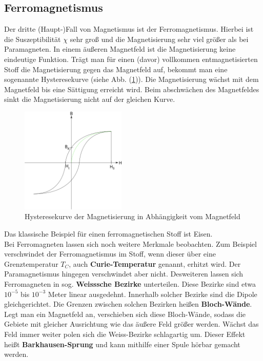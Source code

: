\subsection{Ferromagnetismus}
Der dritte (Haupt-)Fall von Magnetismus ist der Ferromagnetismus. Hierbei ist die Suszeptibilität $\chi$ sehr groß und die Magnetisierung sehr viel größer als bei Paramagneten. In einem äußeren Magnetfeld ist die Magnetisierung keine eindeutige Funktion. Trägt man für einen (davor) vollkommen entmagnetisierten Stoff die Magnetisierung gegen das Magnetfeld auf, bekommt man eine sogenannte Hysteresekurve (siehe Abb. (\ref{hysterese})). Die Magnetisierung wächst mit dem Magnetfeld bis eine Sättigung erreicht wird. Beim abschwächen des Magnetfeldes sinkt die Magnetisierung nicht auf der gleichen Kurve.
\begin{figure}[!htbp]
\centering
\includegraphics[width=5cm]{hysterese.png}
\caption{Hysteresekurve der Magnetisierung in Abhängigkeit vom Magnetfeld} \label{hysterese}
\end{figure}
Das klassische Beispiel für einen ferromagnetischen Stoff ist Eisen.\\
Bei Ferromagneten lassen sich noch weitere Merkmale beobachten. Zum Beispiel verschwindet der Ferromagnetismus im Stoff, wenn dieser über eine Grenztemperatur $T_C$, auch \textbf{Curie-Temperatur} genannt, erhitzt wird. Der Paramagnetismus hingegen verschwindet aber nicht. Desweiteren lassen sich Ferromagneten in sog. \textbf{Weisssche Bezirke} unterteilen. Diese Bezirke sind etwa $10^{-5}$ bis $10^{-3}$ Meter linear ausgedehnt. Innerhalb solcher Bezirke sind die Dipole gleichgerichtet. Die Grenzen zwischen solchen Bezirken heißen \textbf{Bloch-Wände}. Legt man ein Magnetfeld an, verschieben sich diese Bloch-Wände, sodass die Gebiete mit gleicher Ausrichtung wie das äußere Feld größer werden. Wächst das Feld immer weiter polen sich die Weiss-Bezirke schlagartig um. Dieser Effekt heißt \textbf{Barkhausen-Sprung} und kann mithilfe einer Spule hörbar gemacht werden.
